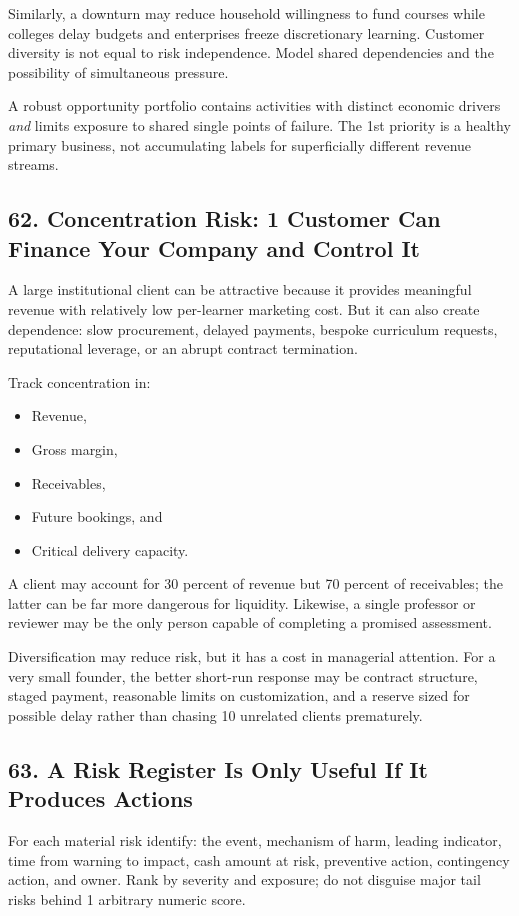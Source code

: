 Similarly, a downturn may reduce household willingness to fund courses while colleges delay budgets and enterprises freeze discretionary learning. Customer diversity is not equal to risk independence. Model shared dependencies and the possibility of simultaneous pressure.

A robust opportunity portfolio contains activities with distinct economic drivers \emph{and} limits exposure to shared single points of failure. The 1st priority is a healthy primary business, not accumulating labels for superficially different revenue streams.

\subsection*{62. Concentration Risk: 1 Customer Can Finance Your Company and Control It}

A large institutional client can be attractive because it provides meaningful revenue with relatively low per-learner marketing cost. But it can also create dependence: slow procurement, delayed payments, bespoke curriculum requests, reputational leverage, or an abrupt contract termination.

Track concentration in:
\begin{itemize}
\item Revenue,
\item Gross margin,
\item Receivables,
\item Future bookings, and
\item Critical delivery capacity.
\end{itemize}
A client may account for 30 percent of revenue but 70 percent of receivables; the latter can be far more dangerous for liquidity. Likewise, a single professor or reviewer may be the only person capable of completing a promised assessment.

Diversification may reduce risk, but it has a cost in managerial attention. For a very small founder, the better short-run response may be contract structure, staged payment, reasonable limits on customization, and a reserve sized for possible delay rather than chasing 10 unrelated clients prematurely.

\subsection*{63. A Risk Register Is Only Useful If It Produces Actions}

For each material risk identify: the event, mechanism of harm, leading indicator, time from warning to impact, cash amount at risk, preventive action, contingency action, and owner. Rank by severity and exposure; do not disguise major tail risks behind 1 arbitrary numeric score.

